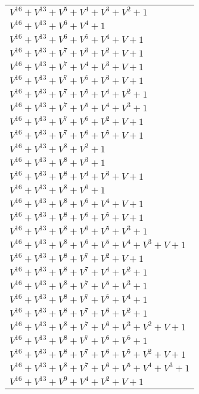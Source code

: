 \documentclass[12pt]{article}
\begin{document}
\begin{adjustwidth}{-4cm}{}
\begin{center}
\begin{longtable}{|l|}
$V^{16}  +V^{13}  +V^{5}  +V^{4}  +V^{3}  +V^{2}  + 1$ \\
$V^{16}  +V^{13}  +V^{6}  +V^{4}  + 1$ \\
$V^{16}  +V^{13}  +V^{6}  +V^{5}  +V^{4}  + V + 1$ \\
$V^{16}  +V^{13}  +V^{7}  +V^{3}  +V^{2}  + V + 1$ \\
$V^{16}  +V^{13}  +V^{7}  +V^{4}  +V^{3}  + V + 1$ \\
$V^{16}  +V^{13}  +V^{7}  +V^{5}  +V^{3}  + V + 1$ \\
$V^{16}  +V^{13}  +V^{7}  +V^{5}  +V^{4}  +V^{2}  + 1$ \\
$V^{16}  +V^{13}  +V^{7}  +V^{5}  +V^{4}  +V^{3}  + 1$ \\
$V^{16}  +V^{13}  +V^{7}  +V^{6}  +V^{2}  + V + 1$ \\
$V^{16}  +V^{13}  +V^{7}  +V^{6}  +V^{5}  + V + 1$ \\
$V^{16}  +V^{13}  +V^{8}  +V^{2}  + 1$ \\
$V^{16}  +V^{13}  +V^{8}  +V^{3}  + 1$ \\
$V^{16}  +V^{13}  +V^{8}  +V^{4}  +V^{3}  + V + 1$ \\
$V^{16}  +V^{13}  +V^{8}  +V^{6}  + 1$ \\
$V^{16}  +V^{13}  +V^{8}  +V^{6}  +V^{4}  + V + 1$ \\
$V^{16}  +V^{13}  +V^{8}  +V^{6}  +V^{5}  + V + 1$ \\
$V^{16}  +V^{13}  +V^{8}  +V^{6}  +V^{5}  +V^{3}  + 1$ \\
$V^{16}  +V^{13}  +V^{8}  +V^{6}  +V^{5}  +V^{4}  +V^{3}  + V + 1$ \\
$V^{16}  +V^{13}  +V^{8}  +V^{7}  +V^{2}  + V + 1$ \\
$V^{16}  +V^{13}  +V^{8}  +V^{7}  +V^{4}  +V^{2}  + 1$ \\
$V^{16}  +V^{13}  +V^{8}  +V^{7}  +V^{5}  +V^{3}  + 1$ \\
$V^{16}  +V^{13}  +V^{8}  +V^{7}  +V^{5}  +V^{4}  + 1$ \\
$V^{16}  +V^{13}  +V^{8}  +V^{7}  +V^{6}  +V^{2}  + 1$ \\
$V^{16}  +V^{13}  +V^{8}  +V^{7}  +V^{6}  +V^{3}  +V^{2}  + V + 1$ \\
$V^{16}  +V^{13}  +V^{8}  +V^{7}  +V^{6}  +V^{5}  + 1$ \\
$V^{16}  +V^{13}  +V^{8}  +V^{7}  +V^{6}  +V^{5}  +V^{2}  + V + 1$ \\
$V^{16}  +V^{13}  +V^{8}  +V^{7}  +V^{6}  +V^{5}  +V^{4}  +V^{3}  + 1$ \\
$V^{16}  +V^{13}  +V^{9}  +V^{4}  +V^{2}  + V + 1$ \\

\end{longtable}
\end{center}
\end{adjustwidth}
\end{document}
